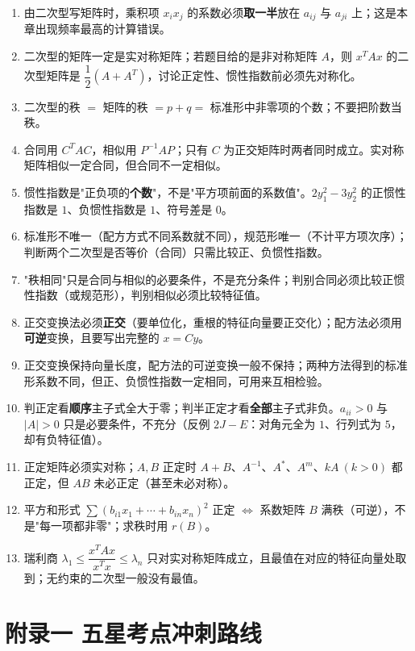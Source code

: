 \documentclass[11pt,openany,UTF8]{ctexbook}
\begin{document}
\begin{enumerate}
\item 由二次型写矩阵时，乘积项 $x_ix_j$ 的系数必须\textbf{取一半}放在 $a_{ij}$ 与 $a_{ji}$ 上；这是本章出现频率最高的计算错误。
\item 二次型的矩阵一定是实对称矩阵；若题目给的是非对称矩阵 $A$，则 $x^TAx$ 的二次型矩阵是 $\dfrac12(A+A^T)$，讨论正定性、惯性指数前必须先对称化。
\item 二次型的秩 $=$ 矩阵的秩 $=p+q=$ 标准形中非零项的个数；不要把阶数当秩。
\item 合同用 $C^TAC$，相似用 $P^{-1}AP$；只有 $C$ 为正交矩阵时两者同时成立。实对称矩阵相似一定合同，但合同不一定相似。
\item 惯性指数是"正负项的\textbf{个数}"，不是"平方项前面的系数值"。$2y_1^2-3y_2^2$ 的正惯性指数是 $1$、负惯性指数是 $1$、符号差是 $0$。
\item 标准形不唯一（配方方式不同系数就不同），规范形唯一（不计平方项次序）；判断两个二次型是否等价（合同）只需比较正、负惯性指数。
\item "秩相同"只是合同与相似的必要条件，不是充分条件；判别合同必须比较正惯性指数（或规范形），判别相似必须比较特征值。
\item 正交变换法必须\textbf{正交}（要单位化，重根的特征向量要正交化）；配方法必须用\textbf{可逆}变换，且要写出完整的 $x=Cy$。
\item 正交变换保持向量长度，配方法的可逆变换一般不保持；两种方法得到的标准形系数不同，但正、负惯性指数一定相同，可用来互相检验。
\item 判正定看\textbf{顺序}主子式全大于零；判半正定才看\textbf{全部}主子式非负。$a_{ii}>0$ 与 $\vert A\vert>0$ 只是必要条件，不充分（反例 $2J-E$：对角元全为 $1$、行列式为 $5$，却有负特征值）。
\item 正定矩阵必须实对称；$A,B$ 正定时 $A+B$、$A^{-1}$、$A^*$、$A^m$、$kA\ (k>0)$ 都正定，但 $AB$ 未必正定（甚至未必对称）。
\item 平方和形式 $\sum(b_{i1}x_1+\cdots+b_{in}x_n)^2$ 正定 $\iff$ 系数矩阵 $B$ 满秩（可逆），不是"每一项都非零"；求秩时用 $r(B)$。
\item 瑞利商 $\lambda_1\leq\dfrac{x^TAx}{x^Tx}\leq\lambda_n$ 只对实对称矩阵成立，且最值在对应的特征向量处取到；无约束的二次型一般没有最值。
\end{enumerate}
\chapter*{附录一 五星考点冲刺路线}
\end{document}
